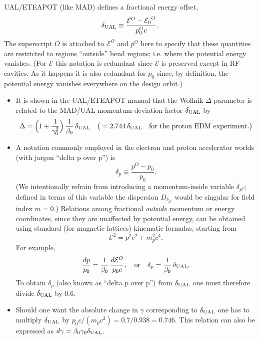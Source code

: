 \documentclass[]{article}
\begin{document}
UAL/ETEAPOT (like MAD) defines a fractional energy offset,
%
\begin{equation}
\delta_{\rm UAL} 
 \equiv 
\frac{{\mathcal E}^O-{\mathcal E_0}^O}{p_0^Oc}.
\label{eq:Offset.2}
\end{equation}
%
The superscript $O$ is attached to ${\mathcal E}^O$ and $p^O$ here to specify 
that these quantities are restricted to regions ``outside'' bend regions;
i.e. where the potential energy vanishes. (For ${\mathcal E}$ this notation
is redundant since ${\mathcal E}$ is preserved except in RF cavities. As it
happens it is also redundant for $p_0$ since, by definition, the potential
energy vanishes everywhere on the design orbit.)
%
\begin{itemize}
\item
It is shown in the UAL/ETEAPOT manual that the Wollnik
$\Delta$ parameter is related to the MAD/UAL momentum deviation 
factor $\delta_{\rm UAL}$ by
%
\begin{equation}
\Delta 
 =
\Big(1 + \frac{1}{\gamma_0^2}\Big)\,\frac{1}{\beta_0}\,\delta_{\rm UAL}
\quad
\big(
 = 
2.744\,\delta_{\rm UAL}
\quad\hbox{for\ the\ proton\ EDM\ experiment.} 
\big)
\label{eq:chromatic.6q}
\end{equation}
%
\item
A notation commonly employed in the electron and proton accelerator 
worlds (with jargon ``delta p over p'') is
%
\begin{equation}
\delta_p
 \equiv 
\frac{p^O-p_0}{p_0}.
\label{eq:Offset.4}
\end{equation}
%
(We intentionally refrain from introducing a
momentum-inside variable $\delta_{p^I}$; defined in terms of this variable the
dispersion $D_{\delta_{p^I}}$ would be singular for field index $m=0$.)
Relations among fractional \emph{outside} momentum or energy coordinates,
since they are unaffected by potential energy, can be
obtained using standard (for magnetic lattices) kinematic
formulas, starting from
%
\begin{equation}
{\mathcal{E}}^2 = p^2c^2 + m_p^2c^4.
\label{eq:Offset.9}
\end{equation}
%
For example,
%
\begin{equation}
\frac{dp}{p_0}
 =
\frac{1}{\beta_0}\,
\frac{d\mathcal{E}^O}{p_0c},
\quad\hbox{or}\quad
\delta_p = \frac{1}{\beta_0}\,\delta_{\rm UAL}.
\label{eq:Offset.10}
\end{equation}
%
To obtain $\delta_p$ (also known as ``delta p over p'') from 
$\delta_{\rm UAL}$ one must therefore divide $\delta_{\rm UAL}$ by 0.6.
\item
Should one want the absolute change in $\gamma$ corresponding to $\delta_{\rm UAL}$
one has to multiply $\delta_{\rm UAL}$ by $p_0c/(m_pc^2)=0.7/0.938=0.746$.
This relation can also be expressed as 
$d\gamma=\beta_0\gamma_0\delta_{\rm UAL}$.
\end{itemize}
%
\end{document}
